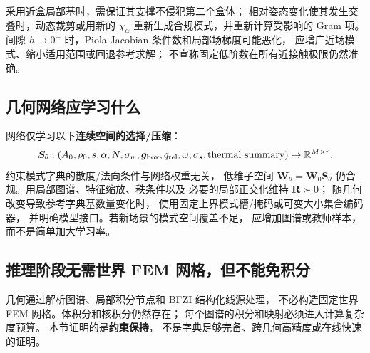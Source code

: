 采用近盒局部基时，需保证其支撑不侵犯第二个盒体；
相对姿态变化使其发生交叠时，动态裁剪或用新的
\(\chi_\alpha\) 重新生成合规模式，并重新计算受影响的 Gram 项。
间隙 \(h\to0^+\) 时，Piola Jacobian 条件数和局部场梯度可能恶化，
应增广近场模式、缩小适用范围或回退参考求解；
不宣称固定低阶数在所有近接触极限仍然准确。

\subsection{几何网络应学习什么}
网络仅学习以下\textbf{连续空间的选择/压缩}：
\[
\bm S_\theta:
(A_0,\varrho_0,s,\alpha,N,\sigma_w,\bm g_{\rm box},
q_{\rm rel},\omega,\sigma_s,\text{thermal summary})
\mapsto\mathbb R^{M\times r}.
\]
约束模式字典的散度/法向条件与网络权重无关，
低维子空间 \( \bm W_\theta=\bm W_0\bm S_\theta\)
仍合规。用局部图谱、特征缩放、秩条件以及
必要的局部正交化维持 \(\bm R\succ0\)；
随几何改变导致参考字典基数量变化时，
使用固定上界模式槽/掩码或可变大小集合编码器，
并明确模型接口。若新场景的模式空间覆盖不足，
应增加图谱或教师样本，而不是简单加大学习率。

\subsection{推理阶段无需世界 FEM 网格，但不能免积分}
几何通过解析图谱、局部积分节点和 BFZI 结构化线源处理，
不必构造固定世界 FEM 网格。体积分和核积分仍然存在；
每个图谱的积分和映射必须进入计算复杂度预算。
本节证明的是\textbf{约束保持}，
不是字典足够完备、跨几何高精度或在线快速的证明。
